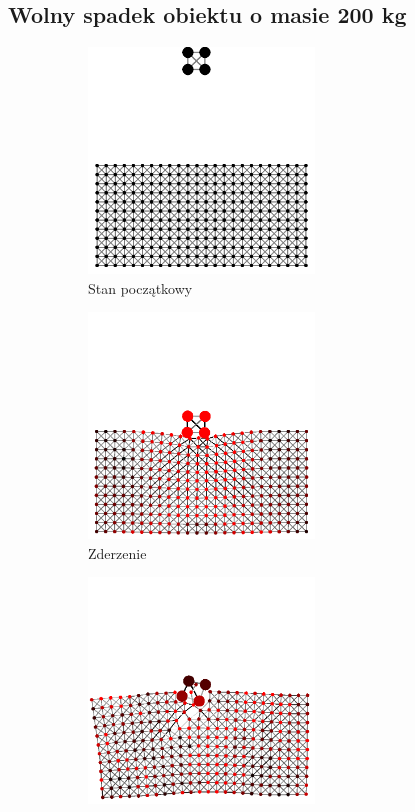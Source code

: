 \documentclass[12pt, letterpaper]{report}
\begin{document}
    \subsection{Wolny spadek obiektu o masie 200 kg}
    \begin{figure}[h]

        \begin{subfigure}{0.5\textwidth}
            \centering
            \includegraphics[width=6cm, height=6cm]{collision_2x2_24x12_mass50_1} 
            \caption{Stan początkowy}
        \end{subfigure}
        \begin{subfigure}{0.5\textwidth}
            \centering
            \includegraphics[width=6cm, height=6cm]{collision_2x2_24x12_mass50_2}
            \caption{Zderzenie}
        \end{subfigure}
        \begin{subfigure}{0.5\textwidth}
            \centering
            \includegraphics[width=6cm, height=6cm]{collision_2x2_24x12_mass50_3}

\end{subfigure}
\end{figure}
\end{document}
